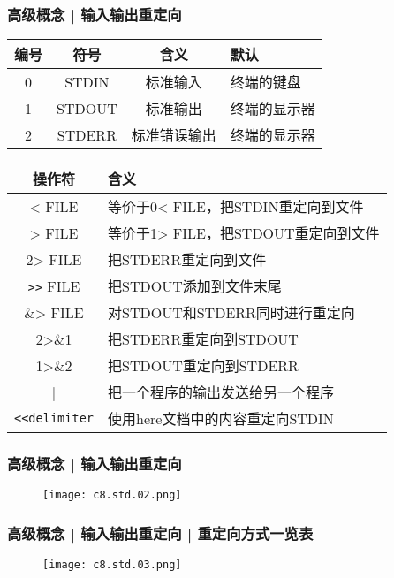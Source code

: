 \begin{frame}[fragile]
  \frametitle{高级概念 | \alert{输入输出重定向}}
  \begin{table}
    \centering
    \begin{tabularx}{0.8\textwidth}{cccX}
      \hline
      \rowcolor{blue!50}编号 & 符号 & 含义 & 默认\\
      \hline
      0 & STDIN & 标准输入 & 终端的键盘\\
      1 & STDOUT & 标准输出 & 终端的显示器\\
      2 & STDERR & 标准错误输出 & 终端的显示器\\
      \hline
    \end{tabularx}
  \end{table}
  \pause
  \begin{table}
    \centering
    \begin{tabularx}{0.9\textwidth}{cX}
      \hline
      \rowcolor{blue!50}操作符 & 含义\\
      \hline
      < FILE & 等价于0< FILE，把STDIN重定向到文件\\
      > FILE & 等价于1> FILE，把STDOUT重定向到文件\\
      2> FILE & 把STDERR重定向到文件\\
      \verb|>>| FILE & 把STDOUT添加到文件末尾\\
      \&> FILE & 对STDOUT和STDERR同时进行重定向\\
      2>\&1 & 把STDERR重定向到STDOUT\\
      1>\&2 & 把STDOUT重定向到STDERR\\
      | & 把一个程序的输出发送给另一个程序\\
      \verb|<<delimiter| & 使用here文档中的内容重定向STDIN\\
      \hline
    \end{tabularx}
  \end{table}
\end{frame}

\begin{frame}
  \frametitle{高级概念 | 输入输出重定向}
  \begin{figure}
    \centering
    \texttt{[image: c8.std.02.png]}
  \end{figure}
\end{frame}

\begin{frame}
  \frametitle{高级概念 | 输入输出重定向 | 重定向方式一览表}
  \begin{figure}
    \centering
    \texttt{[image: c8.std.03.png]}
  \end{figure}
\end{frame}

